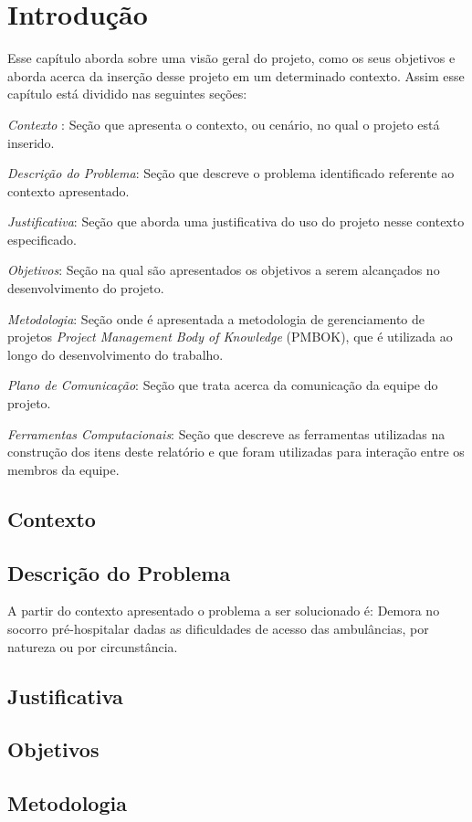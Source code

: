 \chapter[Introdução]{Introdução}\label{cap1}

Esse capítulo aborda sobre uma visão geral do projeto, como os seus objetivos e aborda acerca da inserção desse projeto em um determinado contexto. Assim esse capítulo está dividido nas seguintes seções:

\textit{Contexto} : Seção que apresenta o contexto, ou cenário, no qual o projeto está inserido.

\textit{Descrição do Problema}: Seção que descreve o problema identificado referente ao contexto apresentado.

\textit{Justificativa}: Seção que aborda uma justificativa do uso do projeto nesse contexto especificado.

\textit{Objetivos}: Seção na qual são apresentados os objetivos a serem alcançados no desenvolvimento do projeto.

\textit{Metodologia}: Seção onde é apresentada a metodologia de gerenciamento de projetos \textit{Project Management Body of Knowledge} (PMBOK), que é utilizada ao longo do desenvolvimento do trabalho.

\textit{Plano de Comunicação}: Seção que trata acerca da comunicação da equipe do projeto.

\textit{Ferramentas Computacionais}: Seção que descreve as ferramentas utilizadas na construção dos itens deste relatório e que foram utilizadas para interação entre os membros da equipe.


\section{Contexto}
  

\section{Descrição do Problema}

A partir do contexto apresentado o problema a ser solucionado é:
Demora no socorro pré-hospitalar dadas as dificuldades de acesso das ambulâncias, por natureza ou por circunstância.
  
\section{Justificativa}
  

\section{Objetivos}
  


\section{Metodologia}
   


